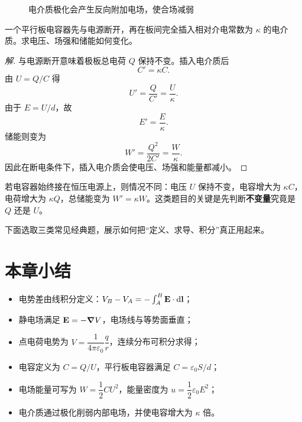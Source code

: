 \begin{figure}[H]
\centering
{}
\caption{电介质极化会产生反向附加电场，使合场减弱}
\end{figure}

\begin{example}
一个平行板电容器先与电源断开，再在板间完全插入相对介电常数为 $\kappa$ 的电介质。求电压、场强和储能如何变化。
\end{example}

\begin{proof}[解]
与电源断开意味着极板总电荷 $Q$ 保持不变。插入电介质后
\[
C'=\kappa C.
\]
由 $U=Q/C$ 得
\[
U'=\frac{Q}{C'}=\frac{U}{\kappa}.
\]
由于 $E=U/d$，故
\[
E'=\frac{E}{\kappa}.
\]
储能则变为
\[
W'=\frac{Q^2}{2C'}=\frac{W}{\kappa}.
\]
因此在断电条件下，插入电介质会使电压、场强和能量都减小。
\end{proof}

\begin{remark}
若电容器始终接在恒压电源上，则情况不同：电压 $U$ 保持不变，电容增大为 $\kappa C$，电荷增大为 $\kappa Q$，总储能变为 $W'=\kappa W$。这类题目的关键是先判断\textbf{不变量}究竟是 $Q$ 还是 $U$。
\end{remark}

下面选取三类常见经典题，展示如何把“定义、求导、积分”真正用起来。

\section*{本章小结}

\begin{itemize}
  \item 电势差由线积分定义：$V_B-V_A=-\int_A^B \vb E\cdot \dd\vb l$；
  \item 静电场满足 $\vb E=-\grad V$，电场线与等势面垂直；
  \item 点电荷电势为 $V=\dfrac{1}{4\pi\varepsilon_0}\dfrac{q}{r}$，连续分布可积分求得；
  \item 电容定义为 $C=Q/U$，平行板电容器满足 $C=\varepsilon_0 S/d$；
  \item 电场能量可写为 $W=\dfrac{1}{2}CU^2$，能量密度为 $u=\dfrac{1}{2}\varepsilon_0E^2$；
  \item 电介质通过极化削弱内部电场，并使电容增大为 $\kappa$ 倍。
\end{itemize}

